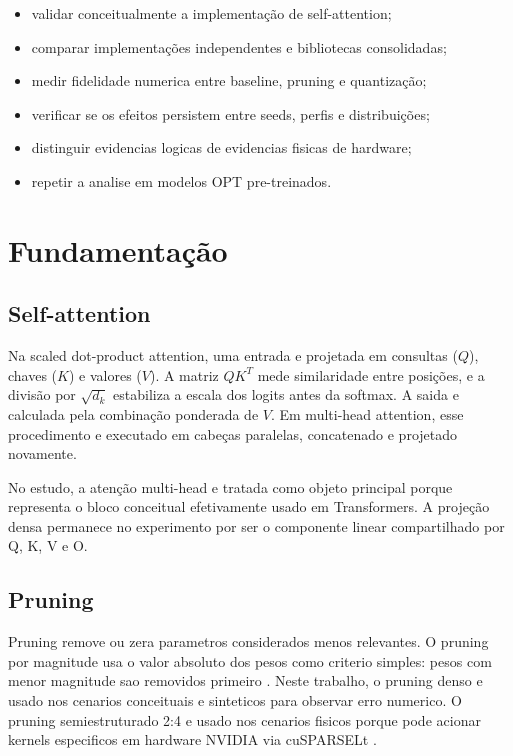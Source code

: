 \documentclass[12pt, a4paper]{article}
\begin{document}
\begin{itemize}
  \item validar conceitualmente a implementa\c{c}\~ao de self-attention;
  \item comparar implementa\c{c}\~oes independentes e bibliotecas consolidadas;
  \item medir fidelidade numerica entre baseline, pruning e quantiza\c{c}\~ao;
  \item verificar se os efeitos persistem entre seeds, perfis e distribui\c{c}\~oes;
  \item distinguir evidencias logicas de evidencias fisicas de hardware;
  \item repetir a analise em modelos OPT pre-treinados.
\end{itemize}

\section{Fundamenta\c{c}\~ao}

\subsection{Self-attention}

Na scaled dot-product attention, uma entrada e projetada em consultas
(\(Q\)), chaves (\(K\)) e valores (\(V\)). A matriz \(QK^T\) mede similaridade
entre posi\c{c}\~oes, e a divis\~ao por \(\sqrt{d_k}\) estabiliza a escala dos
logits antes da softmax. A saida e calculada pela combina\c{c}\~ao ponderada de
\(V\). Em multi-head attention, esse procedimento e executado em cabe\c{c}as
paralelas, concatenado e projetado novamente.

No estudo, a aten\c{c}\~ao multi-head e tratada como objeto principal porque
representa o bloco conceitual efetivamente usado em Transformers. A proje\c{c}\~ao
densa permanece no experimento por ser o componente linear compartilhado por
Q, K, V e O.

\subsection{Pruning}

Pruning remove ou zera parametros considerados menos relevantes. O pruning por
magnitude usa o valor absoluto dos pesos como criterio simples: pesos com menor
magnitude sao removidos primeiro \cite{han2015learning}. Neste trabalho, o
pruning denso e usado nos cenarios conceituais e sinteticos para observar erro
numerico. O pruning semiestruturado 2:4 e usado nos cenarios fisicos porque
pode acionar kernels especificos em hardware NVIDIA via cuSPARSELt
\cite{cusparselt2026}.
\end{document}
